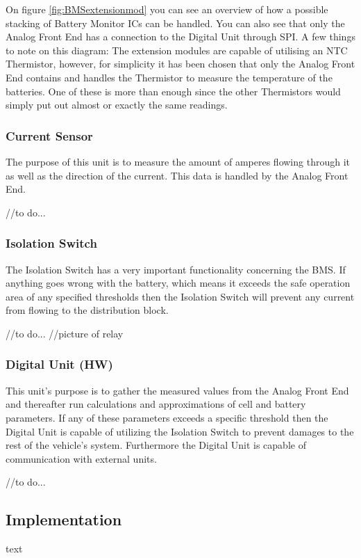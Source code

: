 On figure \ref{fig:BMSextensionmod} you can see an overview of how a possible stacking of Battery Monitor ICs can be handled. You can also see that only the Analog Front End has a connection to the Digital Unit through SPI. A few things to note on this diagram: The extension modules are capable of utilising an NTC Thermistor, however, for simplicity it has been chosen that only the Analog Front End contains and handles the Thermistor to measure the temperature of the batteries. One of these is more than enough since the other Thermistors would simply put out almost or exactly the same readings.

\subsubsection{Current Sensor}
The purpose of this unit is to measure the amount of amperes flowing through it as well as the direction of the current. This data is handled by the Analog Front End.

//to do...

\subsubsection{Isolation Switch}
The Isolation Switch has a very important functionality concerning the BMS. If anything goes wrong with the battery, which means it exceeds the safe operation area of any specified thresholds then the Isolation Switch will prevent any current from flowing to the distribution block.

//to do...
//picture of relay 

\subsubsection{Digital Unit (HW)}
This unit's purpose is to gather the measured values from the Analog Front End and thereafter run calculations and approximations of cell and battery parameters. If any of these parameters exceeds a specific threshold then the Digital Unit is capable of utilizing the Isolation Switch to prevent damages to the rest of the vehicle's system. Furthermore the Digital Unit is capable of communication with external units. 

//to do...

\subsection{Implementation}
text

